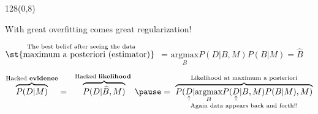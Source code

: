 \documentclass[shownotes]{beamer}
\begin{document}
\begin{frame}
 \begin{textblock}{128}(0,8)
\begin{center}
\normalsize With great overfitting comes great regularization!
\end{center}
\end{textblock}



\begin{center}
 \centering  $ \overset{\text{The best belief after seeing the data}}{\text{\st{maximum a posteriori (estimator)} }}$ = $\underset{B }{\text{argmax}} P(D|B,M) P(B|M) = \widehat{B}$  
\end{center}


\pause

 \begin{equation*}
\overbrace{P(D|M)}^{\text{\scriptsize Hacked \textbf{evidence}}} = \ \ \overbrace{P(D|\widehat{B},M)}^{\text{\scriptsize Hacked \textbf{likelihood} }} \pause  = \  \underset{\text{Again data appears back and forth!!}}{\overbrace{P(\underset{\uparrow}{D}|\underset{B}{\text{argmax}} P(\underset{\uparrow}{D}|B,M)P(B|M),M)}^{\text{\scriptsize Likelihood at maximum a posteriori}}}
\end{equation*}

\pause
\vspace{0.4cm}


\pause 

 
\end{frame}
\end{document}
